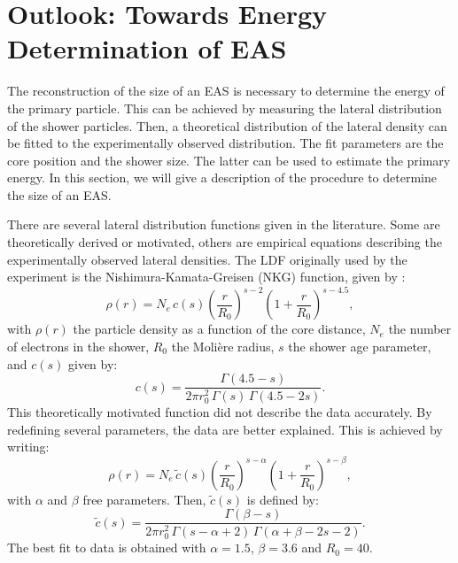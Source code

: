\section{Outlook: Towards Energy Determination of EAS}

The reconstruction of the size of an EAS is necessary to determine the
energy of the primary particle.  This can be achieved by measuring the lateral
distribution of the shower particles.  Then, a theoretical distribution of the
lateral density can be fitted to the experimentally observed distribution. The
fit parameters are the core position and the shower size. The latter can be
used to estimate the primary energy. In this section, we will give a description
of the procedure to determine the size of an EAS.

There are several lateral distribution functions given in the literature.
Some are theoretically derived or motivated, others are empirical equations
describing the experimentally observed lateral densities.  The LDF originally
used by the \kascade experiment is the Nishimura-Kamata-Greisen (NKG) function, given by
\cite{latpaper:2005}:
\begin{equation}
\label{eq:nkg}
\rho(r) = N_e\, c(s) \left(\frac{r}{R_0}\right)^{s - 2} \left(1 +
\frac{r}{R_0}\right)^{s - 4.5},
\end{equation}
with $\rho(r)$ the particle density as a function of the core distance, $N_e$
the number of electrons in the shower, $R_0$ the Molière radius, $s$ the
shower age parameter, and $c(s)$ given by:
\begin{equation}
c(s) = \frac{\Gamma(4.5 - s)}{2\pi r_0^2\, \Gamma(s)\,\Gamma(4.5 - 2s)}.
\end{equation}
This theoretically motivated function did not describe the \kascade data
accurately.  By redefining several parameters, the data are better explained.
This is achieved by writing:
\begin{equation}
\label{eq:ldf}
\rho(r) = N_e\, \tilde{c}(s) \left(\frac{r}{R_0}\right)^{s - \alpha} \left(1 +
\frac{r}{R_0}\right)^{s - \beta},
\end{equation}
with $\alpha$ and
$\beta$ free parameters. Then, $\tilde{c}(s)$ is defined by:
\begin{equation}
\tilde{c}(s) = \frac{\Gamma(\beta - s)}{2\pi r_0^2\, \Gamma(s - \alpha + 2)\,
\Gamma(\alpha + \beta - 2s - 2)}.
\end{equation}
The best fit to \kascade data is obtained with $\alpha = 1.5$, $\beta = 3.6$ and
$R_0 = 40$.

